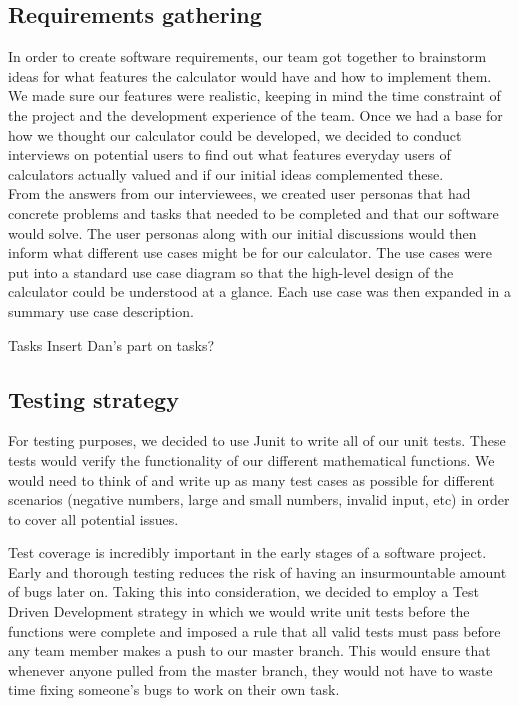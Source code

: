 \documentclass{article}
\begin{document}
\subsection{Requirements gathering}

In order to create software requirements, our team got together to brainstorm ideas for what features the calculator would have and how to implement them. We made sure our features were realistic, keeping in mind the time constraint of the project and the development experience of the team. Once we had a base for how we thought our calculator could be developed, we decided to conduct interviews on potential users to find out what features everyday users of calculators actually valued and if our initial ideas complemented these. \\

From the answers from our interviewees, we created user personas that had concrete problems and tasks that needed to be completed and that our software would solve. The user personas along with our initial discussions would then inform what different use cases might be for our calculator. The use cases were put into a standard use case diagram so that the high-level design of the calculator could be understood at a glance. Each use case was then expanded in a summary use case description.


Tasks
Insert Dan’s part on tasks?

\subsection{Testing strategy}

For testing purposes, we decided to use Junit to write all of our unit tests. These tests would verify the functionality of our different mathematical functions. We would need to think of and write up as many test cases as possible for different scenarios (negative numbers, large and small numbers, invalid input, etc) in order to cover all potential issues. 

Test coverage is incredibly important in the early stages of a software project. Early and thorough testing reduces the risk of having an insurmountable amount of bugs later on. Taking this into consideration, we decided to employ a Test Driven Development strategy in which we would write unit tests before the functions were complete and imposed a rule that all valid tests must pass before any team member makes a push to our master branch. This would ensure that whenever anyone pulled from the master branch, they would not have to waste time fixing someone’s bugs to work on their own task.   
\end{document}
